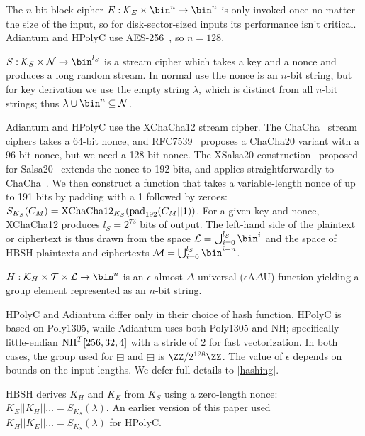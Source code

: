 \documentclass[eprint.tex]{subfiles}
\begin{document}
The $n$-bit block cipher $E: \mathcal{K}_E \times \bin^n \rightarrow \bin^n$
is only invoked once no matter the size of the input, so for disk-sector-sized inputs
its performance isn't critical. Adiantum and HPolyC use AES-256~\cite{AES}, so $n = 128$.

$S: \mathcal{K}_S \times \mathcal{N} \rightarrow \bin^{l_S}$
is a stream cipher which takes a key and a nonce and produces a long random stream. In normal use
the nonce is an $n$-bit string, but for key derivation we use the empty string $\lambda$, which
is distinct from all $n$-bit strings; thus $\lambda \cup \bin^n \subseteq \mathcal{N}$.

Adiantum and HPolyC use the XChaCha12 stream cipher. The ChaCha~\cite{chacha}
stream ciphers takes a 64-bit nonce, and RFC7539~\cite{RFC7539} proposes
a ChaCha20 variant with a 96-bit nonce, but we need a 128-bit nonce.
The XSalsa20 construction~\cite{xsalsa}
proposed for Salsa20~\cite{salsa20,salsa812} extends the nonce to 192 bits, and
applies straightforwardly to ChaCha~\cite{xchacha,monocypher,libsodiumxchacha}.
We then construct a function that takes a variable-length nonce of up to
191 bits by padding with a 1 followed by zeroes:
$S_{K_S}(C_M) = \XChaCha12_{K_S}(\pad_{192}(C_M || 1))$. For a
given key and nonce, XChaCha12 produces $l_S = 2^{73}$ bits of output. The left-hand side
of the plaintext or ciphertext is thus drawn from the space
$\mathcal{L} = \bigcup_{i=0}^{l_S}\bin^i$
and the space of HBSH plaintexts and ciphertexts
$\mathcal{M} = \bigcup_{i=0}^{l_S}\bin^{i + n}$.

$H: \mathcal{K}_H \times \mathcal{T} \times \mathcal{L} \rightarrow \bin^n$
is an $\epsilon$-almost-$\Delta$-universal ($\epsilon$A$\Delta$U) function
yielding a group element represented as an $n$-bit string.

HPolyC and Adiantum differ only in their choice of hash function. HPolyC is
based on Poly1305, while Adiantum uses both Poly1305 and NH;
specifically little-endian $\operatorname{NH}^T[256, 32, 4]$ with a stride of 2 for fast
vectorization. In both cases, the group used for $\boxplus$ and $\boxminus$ is
$\ZZ/2^{128}\ZZ$. The value of $\epsilon$ depends on bounds on the input
lengths. We defer full details to \autoref{hashing}.

HBSH derives $K_H$ and $K_E$ from $K_S$ using a zero-length nonce:
$K_E || K_H || \ldots = S_{K_S}(\lambda)$. An earlier version of this paper
used $K_H || K_E || \ldots = S_{K_S}(\lambda)$ for HPolyC.

\subbib
\end{document}
